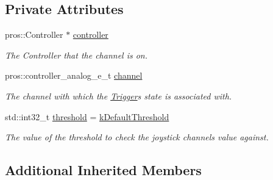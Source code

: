 \subsection*{Private Attributes}
\begin{DoxyCompactItemize}
\item 
\mbox{\label{classlib_iterative_robot_1_1_joystick_channel_a78323bb91c0512d9c9c7b914fc710f65}} 
pros\+::\+Controller $\ast$ \mbox{\hyperlink{classlib_iterative_robot_1_1_joystick_channel_a78323bb91c0512d9c9c7b914fc710f65}{controller}}
\begin{DoxyCompactList}\small\item\em The Controller that the channel is on. \end{DoxyCompactList}\item 
\mbox{\label{classlib_iterative_robot_1_1_joystick_channel_a2985ecdc2e4e6cd768b379abe7726aef}} 
pros\+::controller\+\_\+analog\+\_\+e\+\_\+t \mbox{\hyperlink{classlib_iterative_robot_1_1_joystick_channel_a2985ecdc2e4e6cd768b379abe7726aef}{channel}}
\begin{DoxyCompactList}\small\item\em The channel with which the \mbox{\hyperlink{classlib_iterative_robot_1_1_trigger}{Trigger}}\textquotesingle{}s state is associated with. \end{DoxyCompactList}\item 
\mbox{\label{classlib_iterative_robot_1_1_joystick_channel_acc3695cfa13f8c1fca612d7d0803916e}} 
std\+::int32\+\_\+t \mbox{\hyperlink{classlib_iterative_robot_1_1_joystick_channel_acc3695cfa13f8c1fca612d7d0803916e}{threshold}} = \mbox{\hyperlink{classlib_iterative_robot_1_1_joystick_channel_a29c1fe2a3e5d09fc47d9d7fc4f7b5288}{k\+Default\+Threshold}}
\begin{DoxyCompactList}\small\item\em The value of the threshold to check the joystick channel\textquotesingle{}s value against. \end{DoxyCompactList}\end{DoxyCompactItemize}
\subsection*{Additional Inherited Members}


